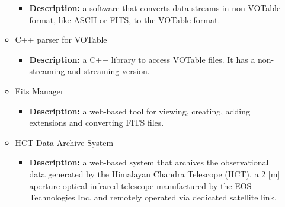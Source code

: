 \begin{itemize}
\begin{itemize}
\begin{itemize}
\item \textbf{Description:} a software that converts data streams in non-VOTable
format, like ASCII or FITS, to the VOTable format.
\end{itemize}
\item C++ parser for VOTable
\begin{itemize}
\item \textbf{Description:} a C++ library to access VOTable files. It has a
non-streaming and streaming version.
\end{itemize}
\item Fits Manager
\begin{itemize}
\item \textbf{Description:} a web-based tool for viewing, creating, adding
extensions and converting FITS files.
\end{itemize}
\item HCT Data Archive System
\begin{itemize}
\item \textbf{Description:} a web-based system that archives the observational
data generated by the Himalayan Chandra Telescope (HCT), a 2 [m] aperture
optical-infrared telescope manufactured by the EOS Technologies Inc. and
remotely operated via dedicated satellite link.
\end{itemize}
\end{itemize}
\end{itemize}
